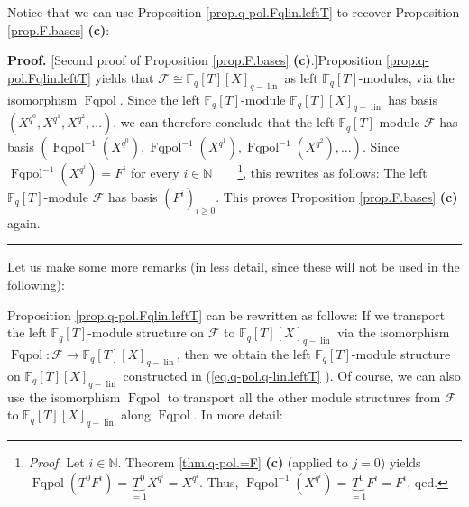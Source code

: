 \documentclass[numbers=enddot,12pt,final,onecolumn,notitlepage]{scrartcl}%
\theoremstyle{definition}
\newenvironment{proof}[1][Proof]{\noindent\textbf{#1.} }{\ \rule{0.5em}{0.5em}}
\begin{document}
Notice that we can use Proposition \ref{prop.q-pol.Fqlin.leftT} to recover
Proposition \ref{prop.F.bases} \textbf{(c)}:

\begin{proof}
[Second proof of Proposition \ref{prop.F.bases} \textbf{(c)}.]Proposition
\ref{prop.q-pol.Fqlin.leftT} yields that $\mathcal{F}\cong\mathbb{F}%
_{q}\left[  T\right]  \left[  X\right]  _{q-\operatorname*{lin}}$ as left
$\mathbb{F}_{q}\left[  T\right]  $-modules, via the isomorphism
$\operatorname*{Fqpol}$. Since the left $\mathbb{F}_{q}\left[  T\right]
$-module $\mathbb{F}_{q}\left[  T\right]  \left[  X\right]
_{q-\operatorname*{lin}}$ has basis $\left(  X^{q^{0}},X^{q^{1}},X^{q^{2}%
},\ldots\right)  $, we can therefore conclude that the left $\mathbb{F}%
_{q}\left[  T\right]  $-module $\mathcal{F}$ has basis $\left(
\operatorname*{Fqpol}\nolimits^{-1}\left(  X^{q^{0}}\right)
,\operatorname*{Fqpol}\nolimits^{-1}\left(  X^{q^{1}}\right)
,\operatorname*{Fqpol}\nolimits^{-1}\left(  X^{q^{2}}\right)  ,\ldots\right)
$. Since $\operatorname*{Fqpol}\nolimits^{-1}\left(  X^{q^{i}}\right)  =F^{i}$
for every $i\in\mathbb{N}$\ \ \ \ \footnote{\textit{Proof.} Let $i\in
\mathbb{N}$. Theorem \ref{thm.q-pol.=F} \textbf{(c)} (applied to $j=0$) yields
$\operatorname*{Fqpol}\left(  T^{0}F^{i}\right)  =\underbrace{T^{0}}%
_{=1}X^{q^{i}}=X^{q^{i}}$. Thus, $\operatorname*{Fqpol}\nolimits^{-1}\left(
X^{q^{i}}\right)  =\underbrace{T^{0}}_{=1}F^{i}=F^{i}$, qed.}, this rewrites
as follows: The left $\mathbb{F}_{q}\left[  T\right]  $-module $\mathcal{F}$
has basis\textbf{ }$\left(  F^{i}\right)  _{i\geq0}$. This proves Proposition
\ref{prop.F.bases} \textbf{(c)} again.
\end{proof}

Let us make some more remarks (in less detail, since these will not be used in
the following):

Proposition \ref{prop.q-pol.Fqlin.leftT} can be rewritten as follows: If we
transport the left $\mathbb{F}_{q}\left[  T\right]  $-module structure on
$\mathcal{F}$ to $\mathbb{F}_{q}\left[  T\right]  \left[  X\right]
_{q-\operatorname*{lin}}$ via the isomorphism $\operatorname*{Fqpol}%
:\mathcal{F}\rightarrow\mathbb{F}_{q}\left[  T\right]  \left[  X\right]
_{q-\operatorname*{lin}}$, then we obtain the left $\mathbb{F}_{q}\left[
T\right]  $-module structure on $\mathbb{F}_{q}\left[  T\right]  \left[
X\right]  _{q-\operatorname*{lin}}$ constructed in (\ref{eq.q-pol.q-lin.leftT}%
). Of course, we can also use the isomorphism $\operatorname*{Fqpol}$ to
transport all the other module structures from $\mathcal{F}$ to $\mathbb{F}%
_{q}\left[  T\right]  \left[  X\right]  _{q-\operatorname*{lin}}$ along
$\operatorname*{Fqpol}$. In more detail:
\end{document}
